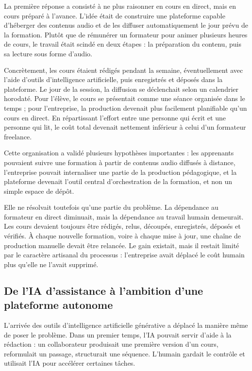 La première réponse a consisté à ne plus raisonner en cours en direct, mais en cours
préparé à l'avance. L'idée était de construire une plateforme capable d'héberger des
contenus audio et de les diffuser automatiquement le jour prévu de la formation. Plutôt
que de rémunérer un formateur pour animer plusieurs heures de cours, le travail était
scindé en deux étapes : la préparation du contenu, puis sa lecture sous forme d'audio.

Concrètement, les cours étaient rédigés pendant la semaine, éventuellement avec l'aide
d'outils d'intelligence artificielle, puis enregistrés et déposés dans la plateforme. Le jour
de la session, la diffusion se déclenchait selon un calendrier horodaté. Pour l'élève, le
cours se présentait comme une séance organisée dans le temps ; pour l'entreprise, la
production devenait plus facilement planifiable qu'un cours en direct. En répartissant
l'effort entre une personne qui écrit et une personne qui lit, le coût total devenait
nettement inférieur à celui d'un formateur freelance.

Cette organisation a validé plusieurs hypothèses importantes : les apprenants pouvaient
suivre une formation à partir de contenus audio diffusés à distance, l'entreprise pouvait
internaliser une partie de la production pédagogique, et la plateforme devenait l'outil
central d'orchestration de la formation, et non un simple espace de dépôt.

Elle ne résolvait toutefois qu'une partie du problème. La dépendance au formateur en
direct diminuait, mais la dépendance au travail humain demeurait. Les cours devaient
toujours être rédigés, relus, découpés, enregistrés, déposés et vérifiés. À chaque nouvelle
formation, voire à chaque mise à jour, une chaîne de production manuelle devait être
relancée. Le gain existait, mais il restait limité par le caractère artisanal du processus :
l'entreprise avait déplacé le coût humain plus qu'elle ne l'avait supprimé.

\subsection{De l'IA d'assistance à l'ambition d'une plateforme autonome}

L'arrivée des outils d'intelligence artificielle générative a déplacé la manière même de
poser le problème. Dans un premier temps, l'IA pouvait servir d'aide à la rédaction : un
collaborateur produisait une première version d'un cours, reformulait un passage,
structurait une séquence. L'humain gardait le contrôle et utilisait l'IA pour accélérer
certaines tâches.


